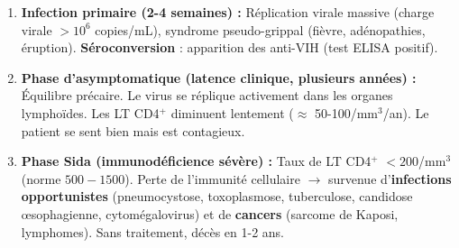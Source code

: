 \documentclass[11pt]{article}
\begin{document}
\begin{propriete}
\begin{enumerate}
    \item \textbf{Infection primaire (2-4 semaines) :} Réplication virale massive (charge virale $> 10^6$ copies/mL), syndrome pseudo-grippal (fièvre, adénopathies, éruption). \textbf{Séroconversion} : apparition des anti-VIH (test ELISA positif).
    \item \textbf{Phase d'asymptomatique (latence clinique, plusieurs années) :} Équilibre précaire. Le virus se réplique activement dans les organes lymphoïdes. Les LT CD4$^+$ diminuent lentement ($\approx$ 50-100/mm$^3$/an). Le patient se sent bien mais est contagieux.
    \item \textbf{Phase Sida (immunodéficience sévère) :} Taux de LT CD4$^+$ $< 200$/mm$^3$ (norme $500-1500$). Perte de l'immunité cellulaire $\rightarrow$ survenue d'\textbf{infections opportunistes} (pneumocystose, toxoplasmose, tuberculose, candidose œsophagienne, cytomégalovirus) et de \textbf{cancers} (sarcome de Kaposi, lymphomes). Sans traitement, décès en 1-2 ans.
\end{enumerate}
\end{propriete}
\end{document}
